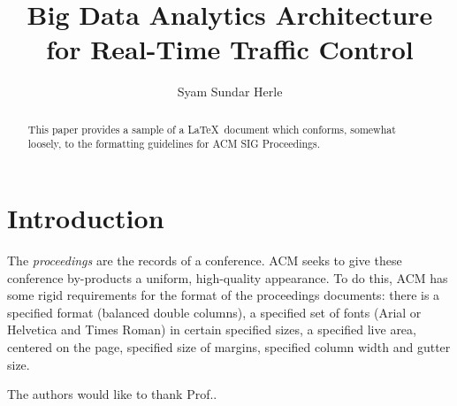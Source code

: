 \documentclass[sigconf]{acmart}
\begin{document}
\title{Big Data Analytics Architecture for Real-Time Traffic Control}


\author{Syam Sundar Herle}
\renewcommand{\shortauthors}{B. Trovato et al.}


\begin{abstract}
This paper provides a sample of a \LaTeX\ document which conforms,
somewhat loosely, to the formatting guidelines for
ACM SIG Proceedings.
\end{abstract}



\maketitle

\section{Introduction}

The \textit{proceedings} are the records of a
conference. ACM seeks to give these
conference by-products a uniform, high-quality appearance.  To do
this, ACM has some rigid requirements for the format of the
proceedings documents: there is a specified format (balanced double
columns), a specified set of fonts (Arial or Helvetica and Times
Roman) in certain specified sizes, a specified live area, centered on
the page, specified size of margins, specified column width and gutter
size\cite{Richly:01}.


\begin{acks}

  The authors would like to thank Prof..

\end{acks}


 
\end{document}
